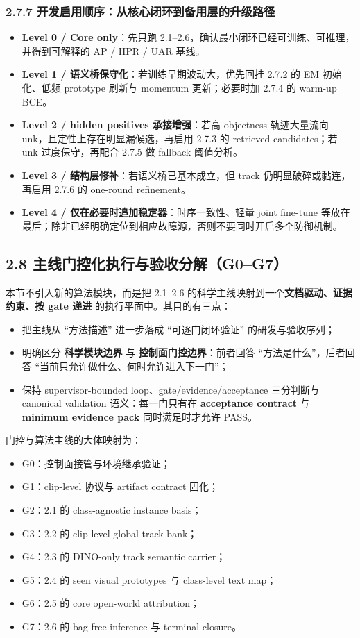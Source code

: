 \documentclass[UTF8]{ctexart}
\begin{document}
\subsubsection*{2.7.7 开发启用顺序：从核心闭环到备用层的升级路径}
\begin{itemize}
\item \textbf{Level 0 / Core only}：先只跑 2.1--2.6，确认最小闭环已经可训练、可推理，并得到可解释的 AP / HPR / UAR 基线。
\item \textbf{Level 1 / 语义桥保守化}：若训练早期波动大，优先回挂 2.7.2 的 EM 初始化、低频 prototype 刷新与 momentum 更新；必要时加 2.7.4 的 warm-up BCE。
\item \textbf{Level 2 / hidden positives 承接增强}：若高 objectness 轨迹大量流向 unk，且定性上存在明显漏候选，再启用 2.7.3 的 retrieved candidates；若 unk 过度保守，再配合 2.7.5 做 fallback 阈值分析。
\item \textbf{Level 3 / 结构层修补}：若语义桥已基本成立，但 track 仍明显破碎或黏连，再启用 2.7.6 的 one-round refinement。
\item \textbf{Level 4 / 仅在必要时追加稳定器}：时序一致性、轻量 joint fine-tune 等放在最后；除非已经明确定位到相应故障源，否则不要同时开启多个防御机制。
\end{itemize}


\subsection*{2.8 主线门控化执行与验收分解（G0--G7）}
本节不引入新的算法模块，而是把 2.1--2.6 的科学主线映射到一个\textbf{文档驱动、证据约束、按 gate 递进} 的执行平面中。其目的有三点：
\begin{itemize}
\item 把主线从 ``方法描述'' 进一步落成 ``可逐门闭环验证'' 的研发与验收序列；
\item 明确区分 \textbf{科学模块边界} 与 \textbf{控制面门控边界}：前者回答 ``方法是什么''，后者回答 ``当前只允许做什么、何时允许进入下一门''；
\item 保持 supervisor-bounded loop、gate/evidence/acceptance 三分判断与 canonical validation 语义：每一门只有在 \textbf{acceptance contract} 与 \textbf{minimum evidence pack} 同时满足时才允许 PASS。
\end{itemize}

\noindent 门控与算法主线的大体映射为：
\begin{itemize}
\item G0：控制面接管与环境继承验证；
\item G1：clip-level 协议与 artifact contract 固化；
\item G2：2.1 的 class-agnostic instance basis；
\item G3：2.2 的 clip-level global track bank；
\item G4：2.3 的 DINO-only track semantic carrier；
\item G5：2.4 的 seen visual prototypes 与 class-level text map；
\item G6：2.5 的 core open-world attribution；
\item G7：2.6 的 bag-free inference 与 terminal closure。
\end{itemize}
\end{document}
